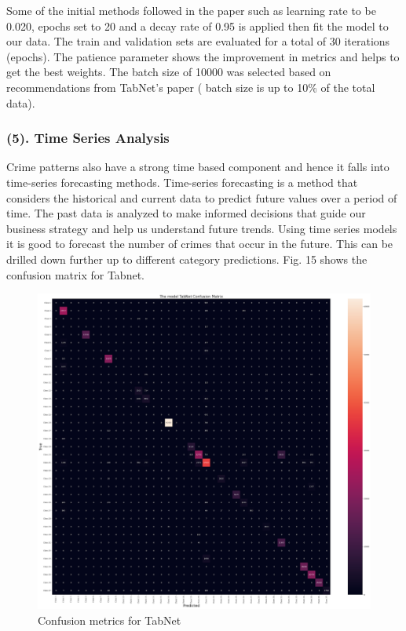 \documentclass[conference,final, 10pt]{IEEEtran}
\begin{document}
Some of the initial methods followed in the paper such as learning rate
to be 0.020, epochs set to 20 and a decay rate of 0.95 is applied then
fit the model to our data. The train and validation sets are evaluated
for a total of 30 iterations (epochs). The patience parameter shows the
improvement in metrics and helps to get the best weights. The batch size
of 10000 was selected based on recommendations from TabNet's paper (
batch size is up to 10\% of the total data).

\subsubsection{(5). Time Series Analysis}\label{time-series-analysis}

Crime patterns also have a strong time based component and hence it
falls into time-series forecasting methods. Time-series forecasting is a
method that considers the historical and current data to predict future
values over a period of time. The past data is analyzed to make informed
decisions that guide our business strategy and help us understand future
trends. Using time series models it is good to forecast the number of
crimes that occur in the future. This can be drilled down further up to
different category predictions. Fig. 15 shows the confusion matrix for
Tabnet.

\begin{figure}

{\centering \includegraphics[width=0.9\linewidth]{img/TabNet} 

}

\caption{Confusion metrics for TabNet}\label{fig:unnamed-chunk-15}
\end{figure}
\end{document}
